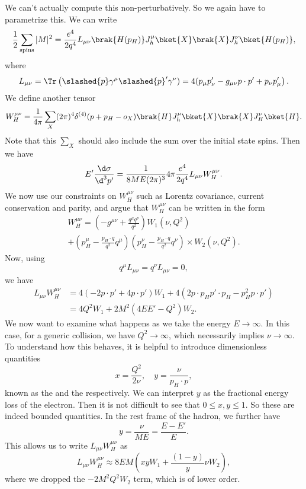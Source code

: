 \documentclass[a4paper]{article}
\begin{document}
We can't actually compute this non-perturbatively. So we again have to parametrize this. We can write
\[
  \frac{1}{2} \sum_{\mathrm{spins}} |M|^2 = \frac{e^4}{2q^4} L_{\mu\nu} \brak{H(p_H)} J_h^\mu \bket{X} \brak{X} J^\nu_h\bket{H(p_H)},
\]
where
\[
  L_{\mu\nu} = \Tr \left(\slashed{p} \gamma^\mu \slashed{p}' \gamma^\nu) = 4(p_\mu p'_\nu - g_{\mu\nu} p \cdot p' + p_\nu p_\mu'\right).
\]
We define another tensor
\[
  W^{\mu\nu}_H = \frac{1}{4\pi} \sum_X (2\pi)^4 \delta^{(4)} (p + p_H - o_X) \brak{H}J_h^\mu \bket{X} \brak{X} J_H^\nu \bket{H}.
\]
Note that this $\sum_X$ should also include the sum over the initial state spins. Then we have
\[
  E' \frac{\d \sigma}{\d^3 p'} = \frac{1}{8ME(2\pi)^3} 4\pi \frac{e^4}{2q^4} L_{\mu\nu} W^{\mu\nu}_H.
\]
We now use our constraints on $W^{\mu\nu}_H$ such as Lorentz covariance, current conservation and parity, and argue that $W^{\mu\nu}_H$ can be written in the form
\begin{multline*}
  W_H^{\mu\nu} = \left(- g^{\mu\nu} + \frac{q^\mu q^\nu}{q^2}\right) W_1(\nu, Q^2) \\
  + \left(p_H^\mu - \frac{p_H \cdot q}{q^2} q^\mu\right) \left(p_H^\nu - \frac{p_H \cdot q}{q^2}q^\nu\right) \times W_2(\nu, Q^2).
\end{multline*}
Now, using
\[
  q^\mu L_{\mu\nu} = q^\nu L_{\mu\nu} = 0,
\]
we have
\begin{align*}
  L_{\mu\nu} W_H^{\mu\nu} &= 4 (-2 p\cdot p' + 4 p\cdot p') W_1 + 4(2 p\cdot p_H p'\cdot p_H - p_H^2 p \cdot p')\\
  &= 4Q^2 W_1 + 2M^2 (4 EE' - Q^2)W_2.
\end{align*}
We now want to examine what happens as we take the energy $E \to \infty$. In this case, for a generic collision, we have $Q^2 \to \infty$, which necessarily implies $\nu \to \infty$. To understand how this behaves, it is helpful to introduce dimensionless quantities
\[
  x = \frac{Q^2}{2 \nu},\quad y = \frac{\nu}{p_H \cdot p},
\]
known as the  and the  respectively. We can interpret $y$ as the fractional energy loss of the electron. Then it is not difficult to see that $0 \leq x, y \leq 1$. So these are indeed bounded quantities. In the rest frame of the hadron, we further have
\[
  y = \frac{\nu}{ME} = \frac{E - E'}{E}.
\]
This allows us to write $L_{\mu\nu}W_H^{\mu\nu}$ as
\[
  L_{\mu\nu} W^{\mu\nu}_H \approx 8EM \left(xy W_1 + \frac{(1 - y)}{y} \nu W_2\right),
\]
where we dropped the $-2M^2Q^2 W_2$ term, which is of lower order.
\end{document}
